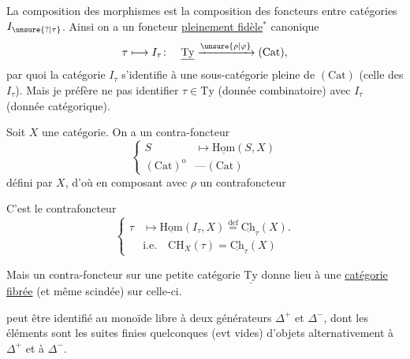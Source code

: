 La composition des morphismes est la composition des foncteurs entre catégories $I_{\unsure{?|\tau}}$. Ainsi on a un foncteur \uline{pleinement fidèle}$^{*}$ canonique
\[ \tau\longmapsto I_\tau\colon\quad \underline{\mathrm{Ty}}\xrightarrow{\unsure{\rho|\varphi}}(\mathrm{Cat}), \]
par quoi la catégorie $I_\tau$  s'identifie à une sous-catégorie pleine de $(\mathrm{Cat})$ (celle des $I_\tau$). Mais je préfère ne pas identifier $\tau\in\mathrm{Ty}$ (donnée combinatoire) avec $I_\tau$ (donnée catégorique).

Soit $X$ une  catégorie. On a un contra-foncteur
\[ \left\{\begin{aligned} S&\longmapsto\underline{\mathrm{Hom}}(S,X)\\ (\mathrm{Cat})^{\mathrm{o}}&\mathbin{\text{---}}(\mathrm{Cat})\end{aligned}\right. \]
défini par $X$, d'où en composant avec $\rho$ un contrafoncteur

C'est le contrafoncteur
\[ \left\{\begin{aligned}
\tau&\longmapsto\underline{\mathrm{Hom}}(I_\tau,X)\overset{\mathrm{def}}{=}\underline{\mathrm{Ch}}_\tau(X).\\
&\text{i.e.}\quad \mathrm{CH}_X(\tau)=\underline{\mathrm{Ch}}_\tau(X)
\end{aligned}\right. \]

Mais un contra-foncteur sur une petite catégorie $\underline{\mathrm{Ty}}$ donne lieu à une \uline{catégorie fibrée} (et même scindée) sur celle-ci.

peut être identifié au monoïde libre  à deux générateurs $\Delta^+$ et $\Delta^-$, dont les éléments  sont les suites finies quelconques (evt vides) d'objets alternativement  à $\Delta^+$ et à $\Delta^-$. 

